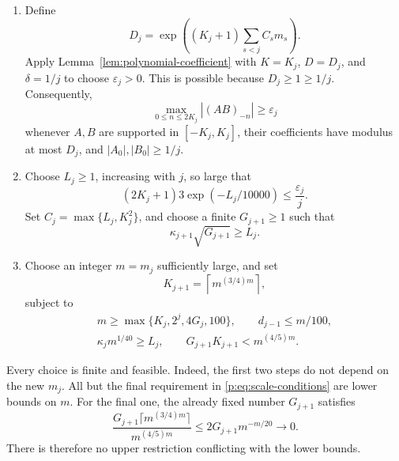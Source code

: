 \begin{enumerate}
\item Define
\[
 D_j=\exp\left((K_j+1)\sum_{s<j}C_sm_s\right).
\]
Apply Lemma~\ref{lem:polynomial-coefficient} with $K=K_j$, $D=D_j$, and
$\delta=1/j$ to choose $\varepsilon_j>0$.  This is possible because
$D_j\ge1\ge1/j$.  Consequently,
\begin{equation}\label{p:eq:poly-lower}
 \max_{0\le n\le2K_j}|(AB)_{-n}|\ge\varepsilon_j
\end{equation}
whenever $A,B$ are supported in $[-K_j,K_j]$, their coefficients
have modulus at most $D_j$, and $|A_0|,|B_0|\ge1/j$.

\item Choose $L_j\ge1$, increasing with $j$, so large that
\begin{equation}\label{p:eq:epsilon-choice}
 (2K_j+1)3\exp(-L_j/10000)\le\frac{\varepsilon_j}{j}.
\end{equation}
Set $C_j=\max\{L_j,K_j^2\}$, and choose a finite $G_{j+1}\ge1$
such that
\begin{equation}\label{p:eq:G-choice}
 \kappa_{j+1}\sqrt{G_{j+1}}\ge L_j.
\end{equation}

\item Choose an integer $m=m_j$ sufficiently large, and set
\[
 K_{j+1}=\left\lceil m^{(3/4)m}\right\rceil,
\]
subject to
\begin{equation}\label{p:eq:scale-conditions}
 \begin{gathered}
 m\ge\max\{K_j,2^j,4G_j,100\},\qquad d_{j-1}\le m/100,\\
 \kappa_jm^{1/40}\ge L_j,\qquad
 G_{j+1}K_{j+1}<m^{(4/5)m}.
 \end{gathered}
\end{equation}
\end{enumerate}

Every choice is finite and feasible.  Indeed, the first two steps do
not depend on the new $m_j$.  All but the final requirement in
\eqref{p:eq:scale-conditions} are lower bounds on $m$.  For the final
one, the already fixed number $G_{j+1}$ satisfies
\[
 \frac{G_{j+1}\lceil m^{(3/4)m}\rceil}{m^{(4/5)m}}
 \le 2G_{j+1}m^{-m/20}\longrightarrow0.
\]
There is therefore no upper restriction conflicting with the lower
bounds.

